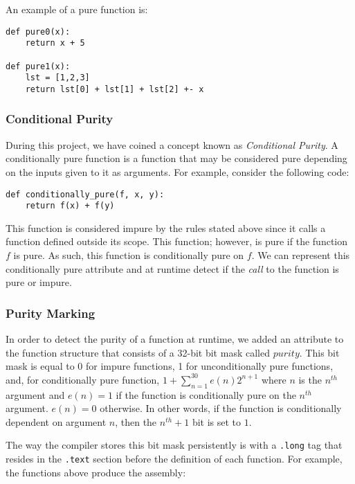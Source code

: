 \documentclass{acm_proc_article-sp}
\begin{document}
An example of a pure function is:

\begin{verbatim}
def pure0(x):
    return x + 5

def pure1(x):
    lst = [1,2,3]
    return lst[0] + lst[1] + lst[2] +- x
\end{verbatim}

\subsubsection*{Conditional Purity}

During this project, we have coined a concept known as \emph{Conditional
Purity}. A conditionally pure function is a function that may be considered
pure depending on the inputs given to it as arguments. For example, consider
the following code:


\begin{verbatim}
def conditionally_pure(f, x, y):
    return f(x) + f(y)
\end{verbatim}

This function is considered impure by the rules stated above since it calls a function defined outside
its scope. This function; however, is pure if the function $f$ is pure. As such, this function is
conditionally pure on $f$. We can represent this conditionally pure attribute and at runtime detect
if the \emph{call} to the function is pure or impure.

\subsubsection*{Purity Marking}

In order to detect the purity of a function at runtime, we added an attribute to the function structure
that consists of a 32-bit bit mask called $purity$. This bit mask is equal to 0 for impure functions, 1 for unconditionally
pure functions, and, for conditionally pure function, $1 + \sum_{n=1}^{30}{e(n)2^{n+1}}$ where $n$ is the $n^{th}$
argument and $e(n)=1$ if the function is conditionally pure on the $n^{th}$ argument. $e(n)=0$ otherwise. In other
words, if the function is conditionally dependent on argument $n$, then the $n^{th} + 1$ bit is set to $1$.

The way the compiler stores this bit mask persistently is with a \verb|.long| tag that resides
in the \verb|.text| section before the definition of each function. For example, the functions
above produce the assembly:
\end{document}
